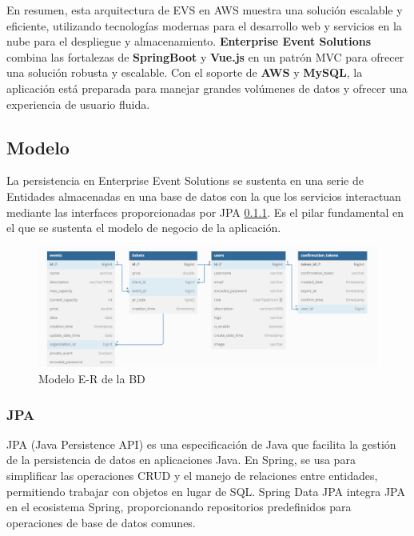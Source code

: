 En resumen, esta arquitectura de EVS en AWS muestra una solución escalable y eficiente, utilizando tecnologías modernas para el desarrollo web y servicios en la nube para el despliegue y almacenamiento. 
\textbf{Enterprise Event Solutions} combina las fortalezas de \textbf{SpringBoot} y \textbf{Vue.js} en un patrón MVC para ofrecer una solución robusta y 
escalable. Con el soporte de \textbf{AWS} y \textbf{MySQL}, la aplicación está preparada para manejar grandes volúmenes de datos y ofrecer una experiencia 
de usuario fluida.

\subsection{Modelo}
La persistencia en Enterprise Event Solutions se sustenta en una serie de Entidades almacenadas en una base de datos con la que los servicios interactuan mediante
las interfaces proporcionadas por JPA \ref{sec:jpa}. Es el pilar fundamental en el que se sustenta el modelo de negocio de la aplicación.
\begin{figure}[h]
    \centering
    \includegraphics[width=1.0\textwidth]{EVSdiagra.png} 
    \caption{Modelo E-R de la BD}
    \label{fig:diagramaBD}
\end{figure}

\subsubsection{JPA}
\label{sec:jpa}

JPA (Java Persistence API) es una especificación de Java que facilita la gestión de la persistencia de datos en aplicaciones Java.
En Spring, se usa para simplificar las operaciones CRUD y el manejo de relaciones entre entidades, permitiendo trabajar con objetos en lugar de SQL. 
Spring Data JPA integra JPA en el ecosistema Spring, proporcionando repositorios predefinidos para operaciones de base de datos comunes.

